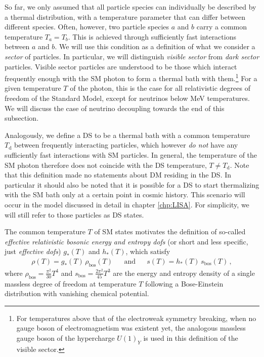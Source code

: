 So far, we only assumed that all particle species can individually be described by a thermal distribution, with a temperature parameter that can differ between different species. Often, however, two particle species $a$ and $b$ carry a common temperature $T_a = T_b$. This is achieved through sufficiently fast interactions between $a$ and $b$.  We will use this condition as a definition of what we consider a \textit{sector} of particles. In particular, we will distinguish \textit{visible sector} from \textit{dark sector} particles. Visible sector particles are understood to be those which interact frequently enough with the \ac{SM} photon to form a thermal bath with them.\footnote{For temperatures above that of the electroweak symmetry breaking, when no gauge boson of electromagnetism was existent yet, the analogous massless gauge boson of the hypercharge $U(1)_Y$ is used in this definition of the visible sector.}  For a given temperature $T$ of the photon, this is the case for all relativistic degrees of freedom of the Standard Model, except for neutrinos below MeV temperatures. We will discuss the case of neutrino decoupling towards the end of this subsection. 

Analogously, we define a \ac{DS} to be a thermal bath with a common temperature $T_\text{d}$ between frequently interacting particles, which however \textit{do not} have any sufficiently fast interactions with \ac{SM} particles. In general, the temperature of the \ac{SM} photon therefore does not coincide  with the \ac{DS} temperature, $T \neq T_\text{d}$. Note that this definition made no statements about \ac{DM} residing in the \ac{DS}. In particular it should also be noted that it is possible for a \ac{DS} to start thermalizing with the \ac{SM} bath only at a certain point in cosmic history. This scenario will occur in the model discussed in detail in chapter \ref{chp:LISA}. For simplicity, we will still refer to those particles as \ac{DS} states.

The common temperature $T$ of \ac{SM} states motivates the definition of so-called \textit{effective relativistic bosonic energy and entropy \acp{dof}} (or short and less specific, just \textit{effective \acp{dof}}) $g_*(T)$ and $h_*(T)$, which satisfy
\begin{align}
	\rho(T) = g_*(T) \,  \rho_\text{bos}(T) && \text{and}&& s(T) = h_*(T) \,  s_\text{bos}(T) \, , \label{eq:gstar1}
\end{align}
where $\rho_\text{bos} = \frac{\pi^2}{30} T^4$ and $s_\text{bos} =  \frac{2\pi^2}{45} T^3$  are the energy and entropy density of a single massless degree of freedom at temperature $T$ following a Bose-Einstein distribution with vanishing chemical potential. 


